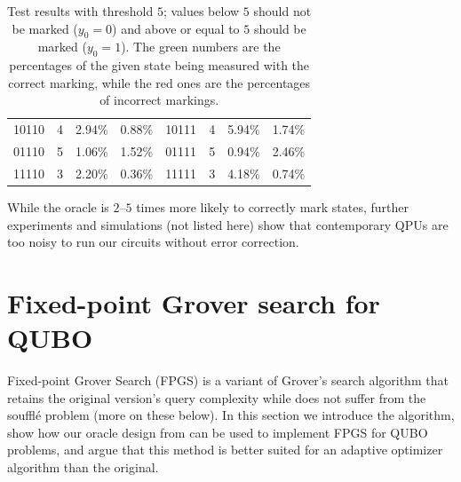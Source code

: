\documentclass[reqno, 10pt]{amsart}
\numberwithin{equation}{section}                     %
\begin{document}
\begin{table}[ht]
\begin{tabular}{|c|c|c|c||c|c|c|c|}
        10110 & 4 & {\color{ForestGreen} 2.94\%} & {\color{Red} 0.88\%} & 10111 & 4 & {\color{ForestGreen} 5.94\%} & {\color{Red} 1.74\%} \\
        01110 & 5 & {\color{Red} 1.06\%} & {\color{ForestGreen} 1.52\%} & 01111 & 5 & {\color{Red} 0.94\%} & {\color{ForestGreen} 2.46\%} \\
        11110 & 3 & {\color{ForestGreen} 2.20\%} & {\color{Red} 0.36\%} & 11111 & 3 & {\color{ForestGreen} 4.18\%} & {\color{Red} 0.74\%} \\
        \hline
    \end{tabular}
    \caption{Test results with threshold $5$; values below $5$ should not be marked ($y_0 = 0$) and above or equal to $5$ should be marked ($y_0 = 1$). The {\color{ForestGreen} green} numbers are the percentages of the given state being measured with the correct marking, while the {\color{Red} red} ones are the percentages of incorrect markings.}
    \label{table:oracle}
\end{table}

While the oracle is $2$--$5$ times more likely to correctly mark states, further experiments and simulations (not listed here) show that contemporary QPUs are too noisy to run our circuits without error correction.

\bigskip

\section{Fixed-point Grover search for QUBO}
\label{sec:grover_for_qubo}

Fixed-point Grover Search (FPGS) \cite{yoder_fixed_2014} is a variant of Grover's search algorithm that retains the original version's query complexity while does not suffer from the souffl\'e problem (more on these below). In this section we introduce the algorithm, show how our oracle design from  can be used to implement FPGS for QUBO problems, and argue that this method is better suited for an adaptive optimizer algorithm than the original.

\smallskip
\end{document}

